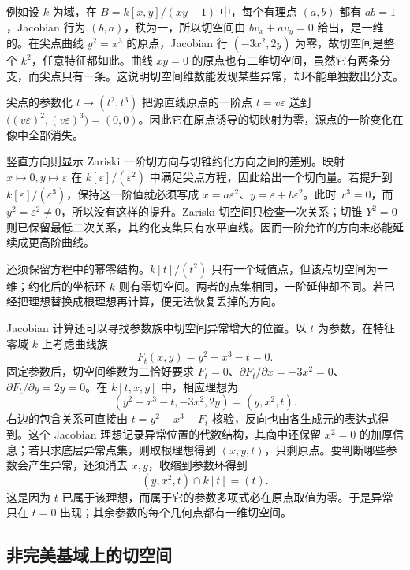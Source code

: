 例如设 \(k\) 为域，在 \(B=k[x,y]/(xy-1)\) 中，每个有理点 \((a,b)\) 都有 \(ab=1\)，Jacobian 行为 \((b,a)\)，秩为一，所以切空间由 \(bv_x+av_y=0\) 给出，是一维的。在尖点曲线 \(y^2=x^3\) 的原点，Jacobian 行 \((-3x^2,2y)\) 为零，故切空间是整个 \(k^2\)，任意特征都如此。曲线 \(xy=0\) 的原点也有二维切空间，虽然它有两条分支，而尖点只有一条。这说明切空间维数能发现某些异常，却不能单独数出分支。

\ProseParagraphBreak
尖点的参数化 \(t\mapsto(t^2,t^3)\) 把源直线原点的一阶点 \(t=v\varepsilon\) 送到 \(\bigl((v\varepsilon)^2,(v\varepsilon)^3\bigr)=(0,0)\)。因此它在原点诱导的切映射为零，源点的一阶变化在像中全部消失。

竖直方向则显示 Zariski 一阶切方向与切锥约化方向之间的差别。映射 \(x\mapsto0,y\mapsto\varepsilon\) 在 \(k[\varepsilon]/(\varepsilon^2)\) 中满足尖点方程，因此给出一个切向量。若提升到 \(k[\varepsilon]/(\varepsilon^3)\)，保持这一阶值就必须写成 \(x=a\varepsilon^2\)、\(y=\varepsilon+b\varepsilon^2\)。此时 \(x^3=0\)，而 \(y^2=\varepsilon^2\ne0\)，所以没有这样的提升。Zariski 切空间只检查一次关系；切锥 \(Y^2=0\) 则已保留最低二次关系，其约化支集只有水平直线。因而一阶允许的方向未必能延续成更高阶曲线。

\ProseParagraphBreak
还须保留方程中的幂零结构。\(k[t]/(t^2)\) 只有一个域值点，但该点切空间为一维；约化后的坐标环 \(k\) 则有零切空间。两者的点集相同，一阶延伸却不同。若已经把理想替换成根理想再计算，便无法恢复丢掉的方向。

\ProseParagraphBreak
Jacobian 计算还可以寻找参数族中切空间异常增大的位置。以 \(t\) 为参数，在特征零域 \(k\) 上考虑曲线族
\[
	F_t(x,y)=y^2-x^3-t=0.
\]
固定参数后，切空间维数为二恰好要求 \(F_t=0\)、\(\partial F_t/\partial x=-3x^2=0\)、\(\partial F_t/\partial y=2y=0\)。在 \(k[t,x,y]\) 中，相应理想为
\[
	(y^2-x^3-t,-3x^2,2y)=(y,x^2,t).
\]
右边的包含关系可直接由 \(t=y^2-x^3-F_t\) 核验，反向也由各生成元的表达式得到。这个 Jacobian 理想记录异常位置的代数结构，其商中还保留 \(x^2=0\) 的加厚信息；若只求底层异常点集，则取根理想得到 \((x,y,t)\)，只剩原点。要判断哪些参数会产生异常，还须消去 \(x,y\)，收缩到参数环得到
\[
	(y,x^2,t)\cap k[t]=(t).
\]
这是因为 \(t\) 已属于该理想，而属于它的参数多项式必在原点取值为零。于是异常只在 \(t=0\) 出现；其余参数的每个几何点都有一维切空间。

\subsection{非完美基域上的切空间}
\label{b3:subsec:1403:03}

